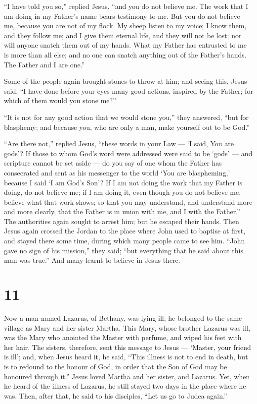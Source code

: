 ``I have told you so,'' replied Jesus, ``and you do not
believe me. The work that I am doing in my Father's name bears testimony
to me.  But you do not believe me, because you are not of
my flock.  My sheep listen to my voice; I know them, and
they follow me;  and I give them eternal life, and they
will not be lost; nor will anyone snatch them out of my hands.
 What my Father has entrusted to me is more than all else;
and no one can snatch anything out of the Father's hands. 
The Father and I are one.''

 Some of the people again brought stones to throw at him;
 and seeing this, Jesus said, ``I have done before your
eyes many good actions, inspired by the Father; for which of them would
you stone me?''

 ``It is not for any good action that we would stone you,''
they answered, ``but for blasphemy; and because you, who are only a man,
make yourself out to be God.''

 ``Are there not,'' replied Jesus, ``these words in your
Law --- `I said, You are gods'?  If those to whom God's
word were addressed were said to be `gods' --- and scripture cannot be
set aside ---  do you say of one whom the Father has
consecrated and sent as his messenger to the world `You are
blaspheming,' because I said `I am God's Son'?  If I am not
doing the work that my Father is doing, do not believe me; 
if I am doing it, even though you do not believe me, believe what that
work shows; so that you may understand, and understand more and more
clearly, that the Father is in union with me, and I with the Father.''
 The authorities again sought to arrest him; but he escaped
their hands.  Then Jesus again crossed the Jordan to the
place where John used to baptise at first, and stayed there some time,
during which many people came to see him.  ``John gave no
sign of his mission,'' they said; ``but everything that he said about
this man was true.''  And many learnt to believe in Jesus
there.

\hypertarget{section-10}{%
\section{11}\label{section-10}}

 Now a man named Lazarus, of Bethany, was lying ill; he
belonged to the same village as Mary and her sister Martha. 
This Mary, whose brother Lazarus was ill, was the Mary who anointed the
Master with perfume, and wiped his feet with her hair.  The
sisters, therefore, sent this message to Jesus --- `Master, your friend
is ill';  and, when Jesus heard it, he said, ``This illness
is not to end in death, but is to redound to the honour of God, in order
that the Son of God may be honoured through it.''  Jesus
loved Martha and her sister, and Lazarus.  Yet, when he
heard of the illness of Lazarus, he still stayed two days in the place
where he was.  Then, after that, he said to his disciples,
``Let us go to Judea again.''

